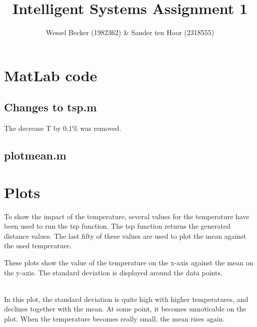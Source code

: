 \documentclass[10pt,a4paper]{article}
\begin{document}
\title{Intelligent Systems Assignment 1}
\author{Wessel Becker (1982362) \& Sander ten Hoor (2318555)}
\maketitle
\section{MatLab code}
\subsection{Changes to tsp.m}
The decrease T by 0.1\% was removed.


\subsection{plotmean.m}


\section{Plots}
To show the impact of the temperature, several values for the temperature have been used to run the tsp function. The tsp function returns the generated distance values. The last fifty of these values are used to plot the mean against the used temperature.

These plots show the value of the temperature on the x-axis against the mean on the y-axis. The standard deviation is displayed around the data points.

 \\
In this plot, the standard deviation is quite high with higher temperatures, and declines together with the mean. At some point, it becomes unnoticable on the plot.
When the temperature becomes really small, the mean rises again.
\end{document}
